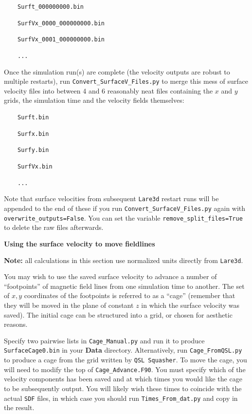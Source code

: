 \documentclass[12pt,twoside]{article}
\begin{document}
$\quad\quad$\texttt{Surft\_000000000.bin}

$\quad\quad$\texttt{SurfVx\_0000\_000000000.bin}

$\quad\quad$\texttt{SurfVx\_0001\_000000000.bin}

$\quad\quad$\texttt{...}

Once the simulation run(s) are complete (the velocity outputs are robust to multiple restarts), run \texttt{Convert\_SurfaceV\_Files.py} to merge this mess of surface velocity files into between 4 and 6 reasonably neat files containing the $x$ and $y$ grids, the simulation time and the velocity fields themselves:

$\quad\quad$\texttt{Surft.bin}

$\quad\quad$\texttt{Surfx.bin}

$\quad\quad$\texttt{Surfy.bin}

$\quad\quad$\texttt{SurfVx.bin}

$\quad\quad$\texttt{...}

Note that surface velocities from subsequent \texttt{Lare3d} restart runs will be appended to the end of these if you run \texttt{Convert\_SurfaceV\_Files.py} again with \texttt{overwrite\_outputs=False}. You can set the variable \texttt{remove\_split\_files=True} to delete the raw files afterwards.


\vspace{8mm}
{\large \textbf{Using the surface velocity to move fieldlines}}

\textbf{Note:} all calculations in this section use normalized units directly from \texttt{Lare3d}.

You may wish to use the saved surface velocity to advance a number of ``footpoints'' of magnetic field lines from one simulation time to another. The set of $x,y$ coordinates of the footpoints is referred to as a ``cage'' (remember that they will be moved in the plane of constant $z$ in which the surface velocity was saved). The initial cage can be structured into a grid, or chosen for aesthetic reasons.

Specify two pairwise lists in \texttt{Cage\_Manual.py} and run it to produce \texttt{SurfaceCage0.bin} in your \textbf{Data} directory. Alternatively, run \texttt{Cage\_FromQSL.py} to produce a cage from the grid written by \texttt{QSL Squasher}. To move the cage, you will need to modify the top of \texttt{Cage\_Advance.F90}. You must specify which of the velocity components has been saved and at which times you would like the cage to be subsequently output. You will likely wish these times to coincide with the actual \texttt{SDF} files, in which case you should run \texttt{Times\_From\_dat.py} and copy in the result.
\end{document}

